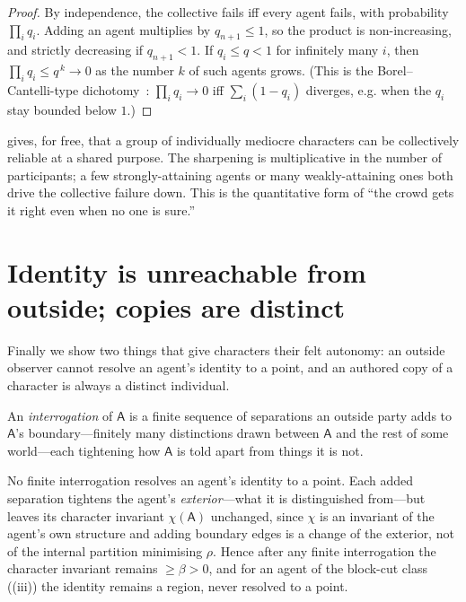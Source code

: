 \documentclass[11pt,twocolumn,a4paper]{article}
\newcommand{\Agent}{\mathsf{A}}
\newcommand{\floorc}{\beta}          %
\newcommand{\Char}{\chi}             %
\begin{document}
\begin{proof}
By independence, the collective fails iff every agent fails, with
probability $\prod_i q_i$. Adding an agent multiplies by $q_{n+1}\le1$, so
the product is non-increasing, and strictly decreasing if $q_{n+1}<1$. If
$q_i\le q<1$ for infinitely many $i$, then $\prod_i q_i\le q^{\,k}\to0$ as
the number $k$ of such agents grows. (This is the Borel--Cantelli-type
dichotomy~\cite{borelcantelli}: $\prod_i q_i\to0$ iff $\sum_i(1-q_i)$
diverges, e.g. when the $q_i$ stay bounded below $1$.)
\end{proof}

\begin{remark}
 gives, for free, that a group of individually mediocre
characters can be collectively reliable at a shared purpose. The
sharpening is multiplicative in the number of participants; a
few strongly-attaining agents or many weakly-attaining ones both drive the
collective failure down. This is the quantitative form of ``the crowd gets
it right even when no one is sure.''
\end{remark}

\section{Identity is unreachable from outside; copies are distinct}
\label{sec:unreachable}

Finally we show two things that give characters their felt autonomy: an
outside observer cannot resolve an agent's identity to a point, and an
authored copy of a character is always a distinct individual.

\begin{definition}[Interrogation]
\label{def:interrogation}
An \emph{interrogation} of $\Agent$ is a finite sequence of separations an
outside party adds to $\Agent$'s boundary---finitely many distinctions
drawn between $\Agent$ and the rest of some world---each tightening how
$\Agent$ is told apart from things it is not.
\end{definition}

\begin{theorem}
\label{thm:unreachable}
No finite interrogation resolves an agent's identity to a point. Each
added separation tightens the agent's \emph{exterior}---what it is
distinguished from---but leaves its character invariant $\Char(\Agent)$
unchanged, since $\Char$ is an invariant of the agent's own structure and
adding boundary edges is a change of the exterior, not of the internal
partition minimising $\rho$. Hence after any finite interrogation the
character invariant remains $\ge\floorc>0$, and for an agent of the
block-cut class ((iii)) the identity remains a region,
never resolved to a point.
\end{theorem}
\end{document}
